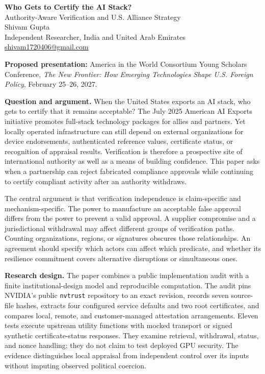 \documentclass[11pt,letterpaper]{article}
\begin{document}
\begin{center}
{\Large\bfseries Who Gets to Certify the AI Stack?}\\[5pt]
{\large Authority-Aware Verification and U.S. Alliance Strategy}\\[9pt]
Shivam Gupta\\
Independent Researcher, India and United Arab Emirates\\
\href{mailto:shivam1720406@gmail.com}{shivam1720406@gmail.com}
\end{center}
\smallskip
\textbf{Proposed presentation:} America in the World Consortium Young Scholars Conference, \emph{The New Frontier: How Emerging Technologies Shape U.S. Foreign Policy}, February 25--26, 2027.

\textbf{Question and argument.} When the United States exports an AI stack, who gets to certify that it remains acceptable? The July 2025 American AI Exports initiative promotes full-stack technology packages for allies and partners. Yet locally operated infrastructure can still depend on external organizations for device endorsements, authenticated reference values, certificate status, or recognition of appraisal results. Verification is therefore a prospective site of international authority as well as a means of building confidence. This paper asks when a partnership can reject fabricated compliance approvals while continuing to certify compliant activity after an authority withdraws.

The central argument is that verification independence is claim-specific and mechanism-specific. The power to manufacture an acceptable false approval differs from the power to prevent a valid approval. A supplier compromise and a jurisdictional withdrawal may affect different groups of verification paths. Counting organizations, regions, or signatures obscures those relationships. An agreement should specify which actors can affect which predicate, and whether its resilience commitment covers alternative disruptions or simultaneous ones.

\textbf{Research design.} The paper combines a public implementation audit with a finite institutional-design model and reproducible computation. The audit pins NVIDIA's public \texttt{nvtrust} repository to an exact revision, records seven source-file hashes, extracts four configured service defaults and two root certificates, and compares local, remote, and customer-managed attestation arrangements. Eleven tests execute upstream utility functions with mocked transport or signed synthetic certificate-status responses. They examine retrieval, withdrawal, status, and nonce handling; they do not claim to test deployed GPU security. The evidence distinguishes local appraisal from independent control over its inputs without imputing observed political coercion.
\end{document}
